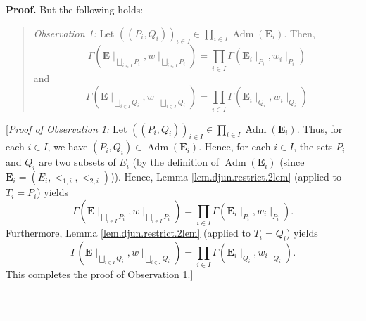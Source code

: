 \documentclass[numbers=enddot,12pt,final,onecolumn,notitlepage,abstracton]{scrartcl}
\theoremstyle{definition}
\newenvironment{statement}{\begin{quote}}{\end{quote}}
\newenvironment{proof}[1][Proof]{\noindent\textbf{#1.} }{\ \rule{0.5em}{0.5em}}
\let\prodnonlimits\prod
\renewcommand{\prod}{\prodnonlimits\limits}
\newenvironment{verlong}{}{}
\begin{document}
\begin{verlong}
\begin{footnotesize}
\begin{proof}
But the following holds:

\begin{statement}
\textit{Observation 1:} Let $\left(  \left(  P_{i},Q_{i}\right)  \right)
_{i\in I}\in\prod_{i\in I}\operatorname*{Adm}\left(  \mathbf{E}_{i}\right)  $.
Then,%
\begin{equation}
\Gamma\left(  {\mathbf{E}}\mid_{\bigsqcup_{i\in I}P_{i}},w\mid_{\bigsqcup
_{i\in I}P_{i}}\right)  =\prod_{i\in I}\Gamma\left(  \mathbf{E}_{i}\mid
_{P_{i}},w_{i}\mid_{P_{i}}\right)  \label{pf.cor.djun.restrict.2.factor1}%
\end{equation}
and%
\begin{equation}
\Gamma\left(  {\mathbf{E}}\mid_{\bigsqcup_{i\in I}Q_{i}},w\mid_{\bigsqcup
_{i\in I}Q_{i}}\right)  =\prod_{i\in I}\Gamma\left(  \mathbf{E}_{i}\mid
_{Q_{i}},w_{i}\mid_{Q_{i}}\right)  \label{pf.cor.djun.restrict.2.factor2}%
\end{equation}

\end{statement}

[\textit{Proof of Observation 1:} Let $\left(  \left(  P_{i},Q_{i}\right)
\right)  _{i\in I}\in\prod_{i\in I}\operatorname*{Adm}\left(  \mathbf{E}%
_{i}\right)  $. Thus, for each $i\in I$, we have $\left(  P_{i},Q_{i}\right)
\in\operatorname*{Adm}\left(  \mathbf{E}_{i}\right)  $. Hence, for each $i\in
I$, the sets $P_{i}$ and $Q_{i}$ are two subsets of $E_{i}$ (by the definition
of $\operatorname*{Adm}\left(  \mathbf{E}_{i}\right)  $ (since $\mathbf{E}%
_{i}=\left(  E_{i},<_{1,i},<_{2,i}\right)  $)). Hence, Lemma
\ref{lem.djun.restrict.2lem} (applied to $T_{i}=P_{i}$) yields%
\[
\Gamma\left(  {\mathbf{E}}\mid_{\bigsqcup_{i\in I}P_{i}},w\mid_{\bigsqcup
_{i\in I}P_{i}}\right)  =\prod_{i\in I}\Gamma\left(  \mathbf{E}_{i}\mid
_{P_{i}},w_{i}\mid_{P_{i}}\right)  .
\]
Furthermore, Lemma \ref{lem.djun.restrict.2lem} (applied to $T_{i}=Q_{i}$)
yields%
\[
\Gamma\left(  {\mathbf{E}}\mid_{\bigsqcup_{i\in I}Q_{i}},w\mid_{\bigsqcup
_{i\in I}Q_{i}}\right)  =\prod_{i\in I}\Gamma\left(  \mathbf{E}_{i}\mid
_{Q_{i}},w_{i}\mid_{Q_{i}}\right)  .
\]
This completes the proof of Observation 1.]


\end{proof}
\end{footnotesize}
\end{verlong}
\end{document}

